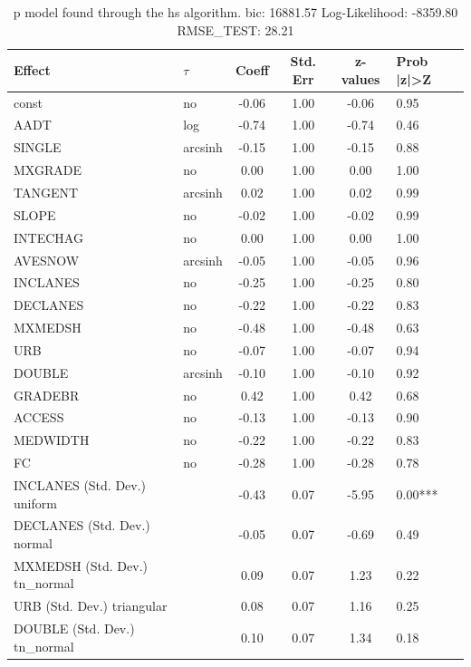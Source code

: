 \begin{table}
	\caption{p model found through the hs algorithm. bic: 16881.57 Log-Likelihood: -8359.80 RMSE_TEST: 28.21}
	\begin{center}
		\begin{tabular}{|l|l|c|c|c|l|}
			\hline
			Effect & $\tau$ & Coeff & Std. Err & z-values & Prob |z|>Z \\
			\hline
			const & no & -0.06 & 1.00 & -0.06 & 0.95 \\
			\hline
			AADT & log & -0.74 & 1.00 & -0.74 & 0.46 \\
			\hline
			SINGLE & arcsinh & -0.15 & 1.00 & -0.15 & 0.88 \\
			\hline
			MXGRADE & no & 0.00 & 1.00 & 0.00 & 1.00 \\
			\hline
			TANGENT & arcsinh & 0.02 & 1.00 & 0.02 & 0.99 \\
			\hline
			SLOPE & no & -0.02 & 1.00 & -0.02 & 0.99 \\
			\hline
			INTECHAG & no & 0.00 & 1.00 & 0.00 & 1.00 \\
			\hline
			AVESNOW & arcsinh & -0.05 & 1.00 & -0.05 & 0.96 \\
			\hline
			INCLANES & no & -0.25 & 1.00 & -0.25 & 0.80 \\
			\hline
			DECLANES & no & -0.22 & 1.00 & -0.22 & 0.83 \\
			\hline
			MXMEDSH & no & -0.48 & 1.00 & -0.48 & 0.63 \\
			\hline
			URB & no & -0.07 & 1.00 & -0.07 & 0.94 \\
			\hline
			DOUBLE & arcsinh & -0.10 & 1.00 & -0.10 & 0.92 \\
			\hline
			GRADEBR & no & 0.42 & 1.00 & 0.42 & 0.68 \\
			\hline
			ACCESS & no & -0.13 & 1.00 & -0.13 & 0.90 \\
			\hline
			MEDWIDTH & no & -0.22 & 1.00 & -0.22 & 0.83 \\
			\hline
			FC & no & -0.28 & 1.00 & -0.28 & 0.78 \\
			\hline
			INCLANES (Std. Dev.) uniform &  & -0.43 & 0.07 & -5.95 & 0.00*** \\
			\hline
			DECLANES (Std. Dev.) normal &  & -0.05 & 0.07 & -0.69 & 0.49 \\
			\hline
			MXMEDSH (Std. Dev.) tn_normal &  & 0.09 & 0.07 & 1.23 & 0.22 \\
			\hline
			URB (Std. Dev.) triangular &  & 0.08 & 0.07 & 1.16 & 0.25 \\
			\hline
			DOUBLE (Std. Dev.) tn_normal &  & 0.10 & 0.07 & 1.34 & 0.18 \\

\end{tabular}
\end{center}
\end{table}
